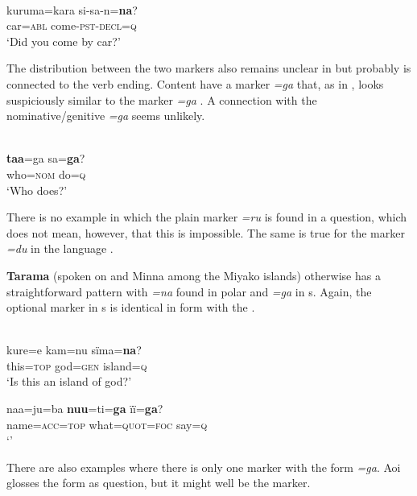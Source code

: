 \ea%
    \label{ex:japa:33}
    \\
    \gll kuruma=kara si-sa-n=\textbf{{na}}?\\
    car=\textsc{abl}    come-\textsc{pst}-\textsc{decl}=\textsc{q}\\
    \glt ‘Did you come by car?’ \citep[102]{Matayoshi2010}
    \z

\noindent The distribution between the two markers also remains unclear in  but probably is connected to the verb ending. Content  have a marker \textit{=ga} that, as in , looks suspiciously similar to the  marker \textit{=ga} \citep[102]{Matayoshi2010}. A connection with the nominative/genitive \textit{=ga} seems unlikely.

\ea%
    \label{ex:japa:34}
    \\
    \gll \textbf{{taa}}=ga sa=\textbf{{ga}}?\\
    who=\textsc{nom}  do=\textsc{q}\\
    \glt ‘Who does?’ \citep[94]{Matayoshi2010}
    \z

There is no example in which the plain  marker \textit{=ru} is found in a question, which does not mean, however, that this is impossible. The same is true for the  marker \textit{=du} in the language .

\textbf{Tarama} (spoken on  and Minna among the Miyako islands) otherwise has a straightforward pattern with \textit{=na} found in polar  and \textit{=ga} in s. Again, the optional  marker in s is identical in form with the .

\ea%
    \label{ex:japa:35}
    \\
    \ea
    \gll kure=e    kam=nu  sïma=\textbf{{na}}?\\
    this=\textsc{top}  god=\textsc{gen}  island=\textsc{q}\\
    \glt ‘Is this an island of god?’
    
    \ex
    \gll naa=ju=ba \textbf{{nuu}}=ti=\textbf{{ga}} ïï=\textbf{{ga}}?\\
    name=\textsc{acc}=\textsc{top}  what=\textsc{quot}=\textsc{foc}  say=\textsc{q}\\
    \glt ‘’ \citep[417]{Aoi2015}
    \z
    \z

There are also examples where there is only one marker with the form \textit{=ga}. Aoi glosses the form as question, but it might well be the  marker.

